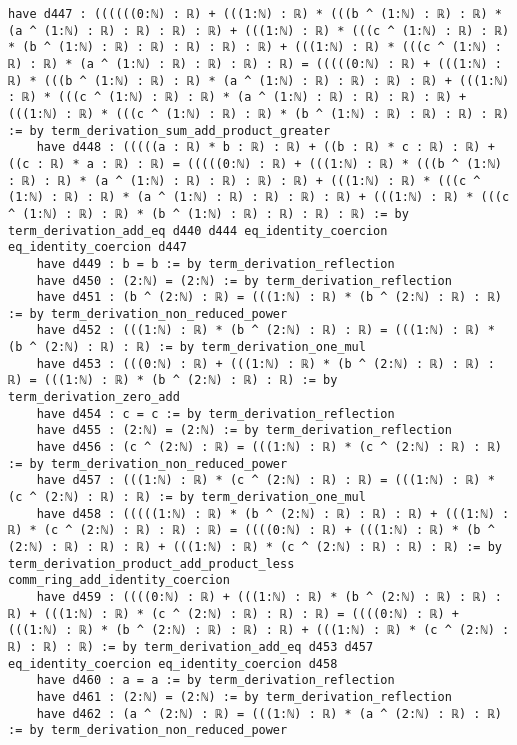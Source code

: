 \documentclass{article}
\begin{document}
\begin{tcolorbox}[colback=white!10, width=\linewidth]
\begin{lstlisting}[language=Lean4]
    have d447 : ((((((0:ℕ) : ℝ) + (((1:ℕ) : ℝ) * (((b ^ (1:ℕ) : ℝ) : ℝ) * (a ^ (1:ℕ) : ℝ) : ℝ) : ℝ) : ℝ) + (((1:ℕ) : ℝ) * (((c ^ (1:ℕ) : ℝ) : ℝ) * (b ^ (1:ℕ) : ℝ) : ℝ) : ℝ) : ℝ) : ℝ) + (((1:ℕ) : ℝ) * (((c ^ (1:ℕ) : ℝ) : ℝ) * (a ^ (1:ℕ) : ℝ) : ℝ) : ℝ) : ℝ) = (((((0:ℕ) : ℝ) + (((1:ℕ) : ℝ) * (((b ^ (1:ℕ) : ℝ) : ℝ) * (a ^ (1:ℕ) : ℝ) : ℝ) : ℝ) : ℝ) + (((1:ℕ) : ℝ) * (((c ^ (1:ℕ) : ℝ) : ℝ) * (a ^ (1:ℕ) : ℝ) : ℝ) : ℝ) : ℝ) + (((1:ℕ) : ℝ) * (((c ^ (1:ℕ) : ℝ) : ℝ) * (b ^ (1:ℕ) : ℝ) : ℝ) : ℝ) : ℝ) := by term_derivation_sum_add_product_greater
    have d448 : (((((a : ℝ) * b : ℝ) : ℝ) + ((b : ℝ) * c : ℝ) : ℝ) + ((c : ℝ) * a : ℝ) : ℝ) = (((((0:ℕ) : ℝ) + (((1:ℕ) : ℝ) * (((b ^ (1:ℕ) : ℝ) : ℝ) * (a ^ (1:ℕ) : ℝ) : ℝ) : ℝ) : ℝ) + (((1:ℕ) : ℝ) * (((c ^ (1:ℕ) : ℝ) : ℝ) * (a ^ (1:ℕ) : ℝ) : ℝ) : ℝ) : ℝ) + (((1:ℕ) : ℝ) * (((c ^ (1:ℕ) : ℝ) : ℝ) * (b ^ (1:ℕ) : ℝ) : ℝ) : ℝ) : ℝ) := by term_derivation_add_eq d440 d444 eq_identity_coercion eq_identity_coercion d447
    have d449 : b = b := by term_derivation_reflection
    have d450 : (2:ℕ) = (2:ℕ) := by term_derivation_reflection
    have d451 : (b ^ (2:ℕ) : ℝ) = (((1:ℕ) : ℝ) * (b ^ (2:ℕ) : ℝ) : ℝ) := by term_derivation_non_reduced_power
    have d452 : (((1:ℕ) : ℝ) * (b ^ (2:ℕ) : ℝ) : ℝ) = (((1:ℕ) : ℝ) * (b ^ (2:ℕ) : ℝ) : ℝ) := by term_derivation_one_mul
    have d453 : (((0:ℕ) : ℝ) + (((1:ℕ) : ℝ) * (b ^ (2:ℕ) : ℝ) : ℝ) : ℝ) = (((1:ℕ) : ℝ) * (b ^ (2:ℕ) : ℝ) : ℝ) := by term_derivation_zero_add
    have d454 : c = c := by term_derivation_reflection
    have d455 : (2:ℕ) = (2:ℕ) := by term_derivation_reflection
    have d456 : (c ^ (2:ℕ) : ℝ) = (((1:ℕ) : ℝ) * (c ^ (2:ℕ) : ℝ) : ℝ) := by term_derivation_non_reduced_power
    have d457 : (((1:ℕ) : ℝ) * (c ^ (2:ℕ) : ℝ) : ℝ) = (((1:ℕ) : ℝ) * (c ^ (2:ℕ) : ℝ) : ℝ) := by term_derivation_one_mul
    have d458 : (((((1:ℕ) : ℝ) * (b ^ (2:ℕ) : ℝ) : ℝ) : ℝ) + (((1:ℕ) : ℝ) * (c ^ (2:ℕ) : ℝ) : ℝ) : ℝ) = ((((0:ℕ) : ℝ) + (((1:ℕ) : ℝ) * (b ^ (2:ℕ) : ℝ) : ℝ) : ℝ) + (((1:ℕ) : ℝ) * (c ^ (2:ℕ) : ℝ) : ℝ) : ℝ) := by term_derivation_product_add_product_less comm_ring_add_identity_coercion
    have d459 : ((((0:ℕ) : ℝ) + (((1:ℕ) : ℝ) * (b ^ (2:ℕ) : ℝ) : ℝ) : ℝ) + (((1:ℕ) : ℝ) * (c ^ (2:ℕ) : ℝ) : ℝ) : ℝ) = ((((0:ℕ) : ℝ) + (((1:ℕ) : ℝ) * (b ^ (2:ℕ) : ℝ) : ℝ) : ℝ) + (((1:ℕ) : ℝ) * (c ^ (2:ℕ) : ℝ) : ℝ) : ℝ) := by term_derivation_add_eq d453 d457 eq_identity_coercion eq_identity_coercion d458
    have d460 : a = a := by term_derivation_reflection
    have d461 : (2:ℕ) = (2:ℕ) := by term_derivation_reflection
    have d462 : (a ^ (2:ℕ) : ℝ) = (((1:ℕ) : ℝ) * (a ^ (2:ℕ) : ℝ) : ℝ) := by term_derivation_non_reduced_power

\end{lstlisting}
\end{tcolorbox}
\end{document}
